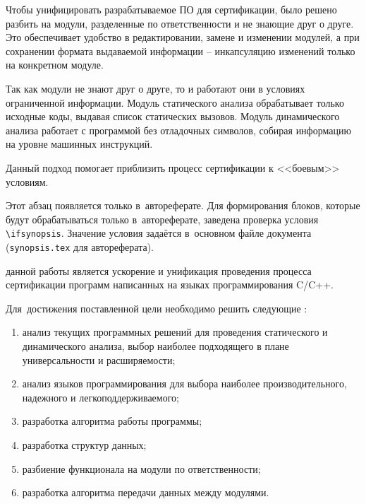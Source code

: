 Чтобы унифицировать разрабатываемое ПО для сертификации, было решено разбить {\ProgModule}
на модули, разделенные по ответственности и не знающие друг о друге. Это обеспечивает
удобство в редактировании, замене и изменении модулей, а при сохранении формата выдаваемой информации
 -- инкапсуляцию изменений только на конкретном модуле.

Так как модули не знают друг о друге, то и работают они в условиях ограниченной информации.
Модуль статического анализа обрабатывает только исходные коды, выдавая список статических
вызовов. Модуль динамического анализа работает с программой без отладочных символов,
собирая информацию на уровне машинных инструкций.

Данный подход помогает приблизить процесс сертификации к <<боевым>> условиям.

\ifsynopsis
Этот абзац появляется только в~автореферате.
Для формирования блоков, которые будут обрабатываться только в~автореферате,
заведена проверка условия \verb!\!\verb!ifsynopsis!.
Значение условия задаётся в~основном файле документа (\verb!synopsis.tex! для
автореферата).
\else
\fi


{\aim} данной работы является ускорение и унификация проведения процесса сертификации
программ написанных на языках программирования C/C++.

Для~достижения поставленной цели необходимо решить следующие {\tasks}:
\begin{enumerate}[label={\arabic*)}]
  \item анализ текущих программных решений для проведения 
        статического и динамического анализа, 
        выбор наиболее подходящего в плане универсальности 
        и расширяемости;
  \item анализ языков программирования для выбора наиболее производительного,
        надежного и легкоподдерживаемого;
  \item разработка алгоритма работы программы;
  \item разработка структур данных;
  \item разбиение функционала {\ProgModule} на модули по ответственности;
  \item разработка алгоритма передачи данных между модулями.
\end{enumerate}


